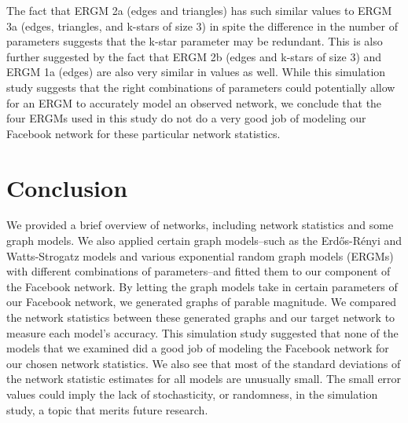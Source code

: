 \documentclass[12pt,twoside]{amherstthesis}
\begin{document}
  The fact that ERGM 2a (edges and triangles) has such similar values to
  ERGM 3a (edges, triangles, and k-stars of size \(3\)) in spite the
  difference in the number of parameters suggests that the k-star
  parameter may be redundant. This is also further suggested by the fact
  that ERGM 2b (edges and k-stars of size \(3\)) and ERGM 1a (edges) are
  also very similar in values as well. While this simulation study
  suggests that the right combinations of parameters could potentially
  allow for an ERGM to accurately model an observed network, we conclude
  that the four ERGMs used in this study do not do a very good job of
  modeling our Facebook network for these particular network statistics.
  
  \chapter{Conclusion}\label{conclusion}
  
  We provided a brief overview of networks, including network statistics
  and some graph models. We also applied certain graph models--such as the
  Erdős-Rényi and Watts-Strogatz models and various exponential random
  graph models (ERGMs) with different combinations of parameters--and
  fitted them to our component of the Facebook network. By letting the
  graph models take in certain parameters of our Facebook network, we
  generated graphs of parable magnitude. We compared the network
  statistics between these generated graphs and our target network to
  measure each model's accuracy. This simulation study suggested that none
  of the models that we examined did a good job of modeling the Facebook
  network for our chosen network statistics. We also see that most of the
  standard deviations of the network statistic estimates for all models
  are unusually small. The small error values could imply the lack of
  stochasticity, or randomness, in the simulation study, a topic that
  merits future research.
  
\end{document}
